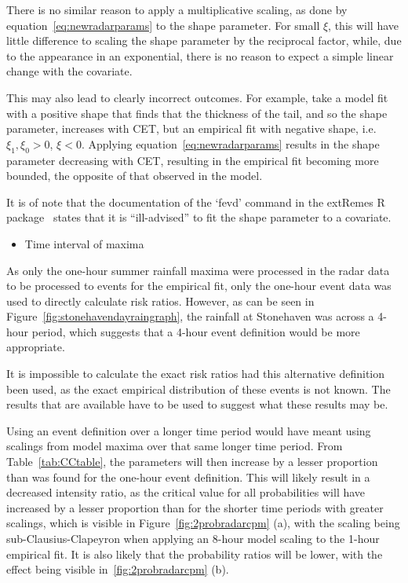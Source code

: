 There is no similar reason to apply a multiplicative scaling,
    as done by equation~\ref{eq:newradarparams} to the shape parameter.
For small $\xi$, this will have little difference to scaling the shape parameter by the reciprocal factor,
    while, due to the appearance in an exponential,
    there is no reason to expect a simple linear change with the covariate.

This may also lead to clearly incorrect outcomes.
For example, take a model fit with a positive shape that finds that the thickness of the tail,
    and so the shape parameter,
    increases with CET,
    but an empirical fit with negative shape, i.e. $\xi_1, \xi_0 > 0$, $\xi < 0$.
Applying equation~\ref{eq:newradarparams} results in the shape parameter decreasing with CET,
    resulting in the empirical fit becoming more bounded,
    the opposite of that observed in the model.

It is of note that the documentation of the `fevd' command in the extRemes R package~\cite{extremes_R} states
    that it is ``ill-advised'' to fit the shape parameter to a covariate.

\begin{itemize}\item Time interval of maxima\end{itemize}

As only the one-hour summer rainfall maxima were processed in the radar data to be processed to events for the empirical fit,
    only the one-hour event data was used to directly calculate risk ratios.
However,
    as can be seen in Figure~\ref{fig:stonehavendayraingraph},
    the rainfall at Stonehaven was across a 4-hour period,
    which suggests that a 4-hour event definition would be more appropriate.

It is impossible to calculate the exact risk ratios had this alternative definition been used,
    as the exact empirical distribution of these events is not known.
The results that are available have to be used to suggest what these results may be.

Using an event definition over a longer time period would have meant using scalings from model maxima over that same longer time period.
From Table~\ref{tab:CCtable},
    the parameters will then increase by a lesser proportion than was found for the one-hour event definition.
This will likely result in a decreased intensity ratio,
    as the critical value for all probabilities will have increased by a lesser proportion than for the shorter time periods with greater scalings,
    which is visible in Figure~\ref{fig:2probradarcpm} (a),
    with the scaling being sub-Clausius-Clapeyron when applying an 8-hour model scaling to the 1-hour empirical fit.
It is also likely that the probability ratios will be lower,
    with the effect being visible in~\ref{fig:2probradarcpm} (b).


